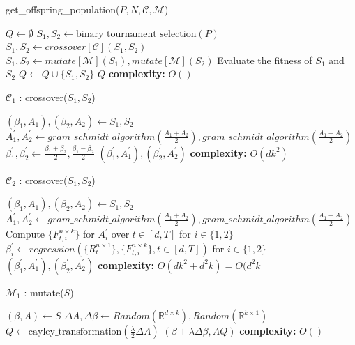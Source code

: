\begin{algorithm}[H]
\caption{get\_offspring\_population($P,N,\mathcal{C},\mathcal{M}$)}\label{nsga2:generate_offspring_population}
\begin{algorithmic}[1]
\State $Q \gets \emptyset$
\State $S_1, S_2 \gets \text{binary\_tournament\_selection}(P)$ 
\State $S_1, S_2 \gets crossover[\mathcal{C}](S_1,S_2) $
\EndIf
{}
\State $S_1, S_2 \gets mutate[\mathcal{M}](S_1),mutate[\mathcal{M}](S_2) $
\EndIf
\State Evaluate the fitness of $S_1$ and $S_2$
\State $Q \gets Q \cup \{S_1, S_2\}$
\EndFor
\State \Return $Q$
\State \textbf{complexity: } $O()$
\end{algorithmic}
\end{algorithm}
\begin{algorithm}[H]
\caption{$\mathcal{C}_1$ : crossover($S_1,S_2$)}\label{nsga2:crossover_1}
\begin{algorithmic}[1]
\State $(\beta_1, A_1), (\beta_2, A_2)\gets S_1, S_2$
\State $A^{'}_1, A^{'}_2\gets gram\_schmidt\_algorithm(\frac{A_1+A_2}{2}), gram\_schmidt\_algorithm(\frac{A_1-A_2}{2})$
\State $\beta^{'}_1, \beta^{'}_2 \gets \frac{\beta_1+\beta_2}{2}, \frac{\beta_1-\beta_2}{2}$
\State \Return $(\beta^{'}_1,A^{'}_1),(\beta^{'}_2,A^{'}_2)$
\State \textbf{complexity: } $O(dk^2)$
\end{algorithmic}
\end{algorithm}
\begin{algorithm}[H]
\caption{$\mathcal{C}_2$ : crossover($S_1,S_2$)}\label{nsga2:crossover_1}
\begin{algorithmic}[1]
\State $(\beta_1, A_1), (\beta_2, A_2)\gets S_1, S_2$
\State $A^{'}_1, A^{'}_2\gets gram\_schmidt\_algorithm(\frac{A_1+A_2}{2}), gram\_schmidt\_algorithm(\frac{A_1-A_2}{2})$
\State Compute $\{F^{n\times k}_{t, i}\}$ for $A^{'}_i$ over $t\in [d,T]$ for $i\in \{1,2\}$
\State $\beta^{'}_i \gets regression(\{R^{n\times 1}_{t}\},\{F^{n\times k}_{t, i}\}, t\in [d,T])$ for $i\in \{1,2\}$
\State \Return $(\beta^{'}_1,A^{'}_1),(\beta^{'}_2,A^{'}_2)$
\State \textbf{complexity: } $O(dk^2+d^2k) = O(d^2k$
\end{algorithmic}
\end{algorithm}
\begin{algorithm}[H]
\caption{$\mathcal{M}_1$ : mutate($S$)}\label{nsga2:mutate_1}
\begin{algorithmic}[1]
\State $(\beta, A)\gets S$
\State $\Delta A, \Delta \beta \gets Random(\mathbb{R}^{d\times k}),Random(\mathbb{R}^{k\times 1})$
\State $Q \gets \text{cayley\_transformation}(\frac{\lambda}{2} \Delta A)$
\State \Return $(\beta + \lambda \Delta \beta, AQ)$
\State \textbf{complexity: } $O()$
\end{algorithmic}
\end{algorithm}

